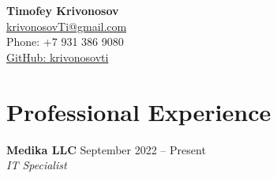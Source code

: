 \documentclass[a4paper,10pt]{article}
\begin{document}
\pagestyle{empty}

\begin{center}
    {\LARGE \textbf{Timofey Krivonosov}}\\
    \vspace{0.2cm}
    \href{mailto:krivonosovTi@gmail.com}{krivonosovTi@gmail.com} \\
    Phone: +7 931 386 9080 \\
    \href{https://github.com/krivonosovti}{GitHub: krivonosovti} \\
\end{center}

\vspace{0.5cm}

\section*{Professional Experience}

\textbf{Medika LLC} \hfill September 2022 – Present \\
\textit{IT Specialist} \\
\end{document}
